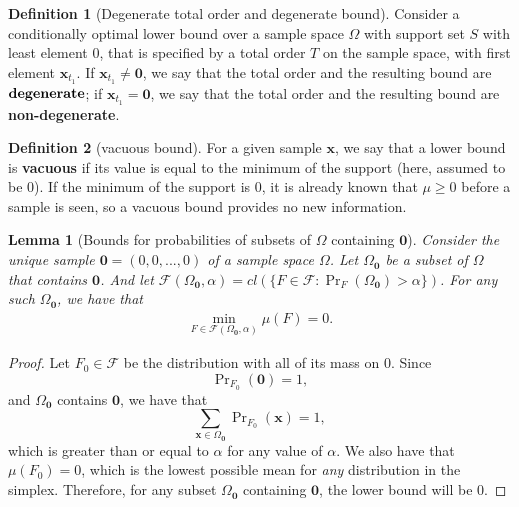 \documentclass{article}
\newtheorem{lemma}[theorem]{Lemma}
\theoremstyle{definition}
\newtheorem{definition}{Definition}[section]
\theoremstyle{remark}
\def\x{\mathbf{x}}
\begin{document}
\begin{definition}[Degenerate total order and degenerate bound]
Consider a conditionally optimal lower bound over a sample space $\Omega$ with support set $S$ with least element $0$, that is specified by a total order $T$ on the sample space, with first element $\x_{t_1}$. If $\x_{t_1} \neq \mathbf{0}$, we say that the total order and the resulting bound are ${\bf degenerate}$; if $\x_{t_1}=\mathbf{0}$, we say that the total order and the resulting bound are {\bf non-degenerate}.  
\end{definition}

\begin{definition}[vacuous bound]
    For a given sample $\x$, we say that a lower bound is {\bf vacuous} if its value is equal to the minimum of the support (here, assumed to be $0$). If the minimum of the support is $0$, it is already known that $\mu\geq 0$ before a sample is seen, so a vacuous bound provides no new information.
\end{definition}

\begin{lemma}[Bounds for probabilities of subsets of $\Omega$ containing $\mathbf{0}$] 
\label{lemma:leastSample}
 Consider the unique sample $\mathbf{0}=(0,0,...,0)$ of a sample space $\Omega$. Let $\Omega_{\mathbf{0}}$ be a subset of $\Omega$ that contains $\mathbf{0}$. And let $\mathcal{F}(\Omega_{\mathbf{0}},\alpha)= cl(\{F\in \mathcal{F}: \Pr_F(\Omega_{\mathbf{0}}) > \alpha\})$. For any such $\Omega_{\mathbf{0}}$, we have that
\begin{eqnarray}
\min_{F \in \mathcal{F}(\Omega_{\mathbf{0}},\alpha)} \mu(F)=0.
\end{eqnarray}
\end{lemma}
\begin{proof}
Let $F_0 \in \mathcal{F}$ be the distribution with all of its mass on $0$. Since 
$$
\Pr\nolimits_{F_0}(\mathbf{0}) = 1,
$$
and
$\Omega_{\mathbf{0}}$ contains $\mathbf{0}$, we have
that 
$$
\sum_{\x\in \Omega_{\mathbf{0}}} \Pr\nolimits_{F_0}(\x) =1,
$$
which is greater than or equal to $\alpha$ for any value of $\alpha$. 
We also have that $\mu(F_0) = 0$, which is the lowest possible mean for \emph{any} distribution in the simplex. Therefore, for any subset $\Omega_{\mathbf{0}}$ containing $\mathbf{0}$, the lower bound will be 0.
\end{proof}
\end{document}
